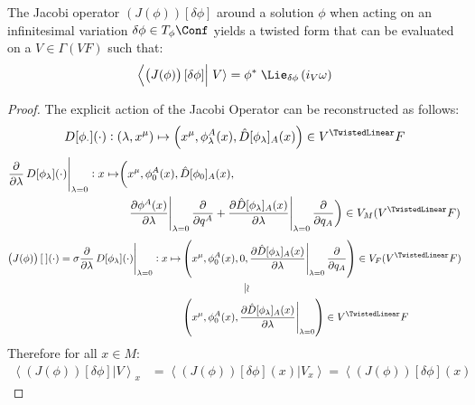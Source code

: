 \documentclass[a4paper,12pt,fleqn]{scrartcl}  %
\begin{document}
\begin{proposition}\label{Prop:JacobieLie}
	The Jacobi operator $\left(J(\phi) \right) [\delta \phi]$
	around a solution $\phi$ when acting on an infinitesimal variation $\delta \phi \in T_\phi \Conf$
	yields a twisted form that can be evaluated on a $V \in \Gamma\left(V F \right)$
	such that:
	\begin{displaymath}	
		\left\langle \left(J(\phi) \right) [\delta \phi] \right\vert
		\left. V \right\rangle =
		\phi^\ast \; \Lie_{\delta \phi} \left( i_V \omega \right)
	\end{displaymath}
\end{proposition}
\begin{proof}
The explicit action of the Jacobi Operator can be reconstructed as follows:
\begin{displaymath}
	D[\phi_\cdot](\cdot): (\lambda, x^\mu) \mapsto
	\left( x^\mu, \phi_\lambda^A (x), \hat{D}[\phi_\lambda]_A(x) \right)
	\in V^\TwistedLinear F 
\end{displaymath}
%
\begin{align*}
	\frac{\partial}{\partial \lambda} \eval{D[\phi_\lambda](\cdot)}_{\lambda=0}:
	x \mapsto
	\biggr(& x^\mu, \phi_0^A(x), \hat{D}[\phi_0]_A(x),\\
	&	
	\eval{\dfrac{\partial \phi^A(x)}{\partial \lambda}}_{\lambda=0}
	 \dfrac{\partial}{\partial q^A} + 
	\eval{\dfrac{\partial \hat{D}[\phi_\lambda]_A(x)}{\partial \lambda}}_{\lambda=0}
	 \dfrac{\partial}{\partial q_A}	  \biggr)
	 \in V_M(V^\TwistedLinear F)
\end{align*}
\begin{align*}
	\left(J(\phi)\right) [\: ] (\cdot) =
	\sigma \frac{\partial}{\partial \lambda} \eval{D[\phi_\lambda](\cdot)}_{\lambda=0}:
	x \mapsto &
	\left( x^\mu, \phi_0^A(x), 0,
	\eval{\dfrac{\partial \hat{D}[\phi_\lambda]_A(x)}{\partial \lambda}}_{\lambda=0}
	 \dfrac{\partial}{\partial q_A}	  \right)
	 \in V_F(V^\TwistedLinear F) \\
	 & \qquad \qquad \qquad \vert\wr \\
	 &
		\left( x^\mu, \phi_0^A(x),
			\eval{\dfrac{\partial \hat{D}[\phi_\lambda]_A(x)}{\partial \lambda}}_{\lambda=0} \right)
	 		\in V^\TwistedLinear F 
\end{align*}
	Therefore for all $x\in M$:
	\begin{align*}
		\left\langle \left(J(\phi) \right) [\delta \phi] \right\vert
		\left. V \right\rangle_x &=
		\left\langle \left(J(\phi) \right) [\delta \phi] (x) \right\vert
		\left. V_x \right\rangle =
		\left\langle \left(J(\phi) \right) [\delta \phi] (x)

\end{align*}
\end{proof}
\end{document}
